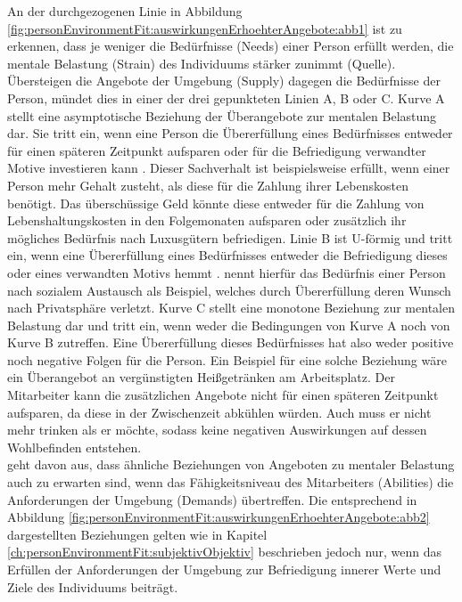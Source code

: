 An der durchgezogenen Linie in Abbildung \ref{fig:personEnvironmentFit:auswirkungenErhoehterAngebote:abb1} ist zu erkennen, dass je weniger die Bedürfnisse (Needs) einer Person erfüllt werden, die mentale Belastung (Strain) des Individuums stärker zunimmt (Quelle). Übersteigen die Angebote der Umgebung (Supply) dagegen die Bedürfnisse der Person, mündet dies in einer der drei gepunkteten Linien A, B oder C. Kurve A stellt eine asymptotische Beziehung der Überangebote zur mentalen Belastung dar. Sie tritt ein, wenn eine Person die Übererfüllung eines Bedürfnisses entweder für einen späteren Zeitpunkt aufsparen oder für die Befriedigung verwandter Motive investieren kann \cite[S. 5f.]{caplan:1987}. Dieser Sachverhalt ist beispielsweise erfüllt, wenn einer Person mehr Gehalt zusteht, als diese für die Zahlung ihrer Lebenskosten benötigt. Das überschüssige Geld könnte diese entweder für die Zahlung von Lebenshaltungskosten in den Folgemonaten aufsparen oder zusätzlich ihr mögliches Bedürfnis nach Luxusgütern befriedigen. Linie B ist U-förmig und tritt ein, wenn eine Übererfüllung eines Bedürfnisses entweder die Befriedigung dieses oder eines verwandten Motivs hemmt \cite[S. 5]{caplan:1987}. \textcite{harrison:1978} nennt hierfür das Bedürfnis einer Person nach sozialem Austausch als Beispiel, welches durch Übererfüllung deren Wunsch nach Privatsphäre verletzt. Kurve C stellt eine monotone Beziehung zur mentalen Belastung dar und tritt ein, wenn weder die Bedingungen von Kurve A noch von Kurve B zutreffen. Eine Übererfüllung dieses Bedürfnisses hat also weder positive noch negative Folgen für die Person. Ein Beispiel für eine solche Beziehung wäre ein Überangebot an vergünstigten Heißgetränken am Arbeitsplatz. Der Mitarbeiter kann die zusätzlichen Angebote nicht für einen späteren Zeitpunkt aufsparen, da diese in der Zwischenzeit abkühlen würden. Auch muss er nicht mehr trinken als er möchte, sodass keine negativen Auswirkungen auf dessen Wohlbefinden entstehen. \\
\textcite{harrison:1978} geht davon aus, dass ähnliche Beziehungen von Angeboten zu mentaler Belastung auch zu erwarten sind, wenn das Fähigkeitsniveau des Mitarbeiters (Abilities) die Anforderungen der Umgebung (Demands) übertreffen. Die entsprechend in Abbildung \ref{fig:personEnvironmentFit:auswirkungenErhoehterAngebote:abb2} dargestellten Beziehungen gelten wie in Kapitel \ref{ch:personEnvironmentFit:subjektivObjektiv} beschrieben jedoch nur, wenn das Erfüllen der Anforderungen der Umgebung zur Befriedigung innerer Werte und Ziele des Individuums beiträgt. \\
